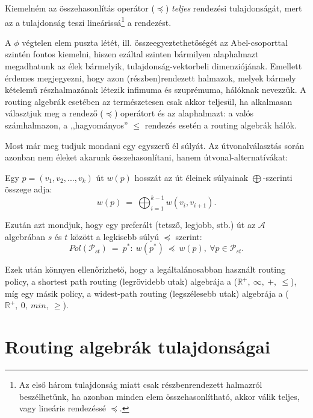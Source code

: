   \begin{note}
    Kiemelném az összehasonlítás operátor ($\preceq$) \emph{teljes} rendezési tulajdonságát, mert az a tulajdonság teszi lineárissá\footnote{Az első három tulajdonság miatt csak részbenrendezett halmazról beszélhetünk, ha azonban minden elem összehasonlítható, akkor válik teljes, vagy lineáris rendezéssé $\preceq$.} a rendezést.
  \end{note}

  \begin{note}
    A $\phi$ végtelen elem puszta létét, ill. összeegyeztethetőségét az Abel-csoporttal szintén fontos kiemelni, hiszen ezáltal szinten bármilyen alaphalmazt megadhatunk az élek bármelyik, tulajdonság-vektorbeli dimenziójának. Emellett érdemes megjegyezni, hogy azon (részben)rendezett halmazok, melyek bármely kételemű részhalmazának létezik infimuma és szuprémuma, hálóknak nevezzük. A routing algebrák esetében az természetesen csak akkor teljesül, ha alkalmasan választjuk meg a rendező ($\preceq$) operátort és az alaphalmazt: a valós számhalmazon, a ,,hagyományos'' $\leq$ rendezés esetén a routing algebrák hálók.
  \end{note}

  Most már meg tudjuk mondani egy egyszerű él súlyát. Az útvonalválasztás során azonban nem éleket akarunk összehasonlítani, hanem útvonal-alternatívákat:

  \begin{definition} 
    Egy $p=(v_{1}, v_{2}, ..., v_{k})$ út $w(p)$ hosszát az út éleinek súlyainak $\bigoplus$-szerinti összege adja: $$w(p)~=~\bigoplus_{i=1}^{k-1}w(v_{i}, v_{i+1}).$$
  \end{definition}

  Ezután azt mondjuk, hogy egy preferált (tetsző, legjobb, stb.) út az $\mathcal{A}$ algebrában $s$ és $t$ között a legkisebb súlyú $\preceq$ szerint: $$Pol(\mathcal{P}_{st})~=~p^{*}:~w(p^{*})~\preceq~w(p),~\forall p \in \mathcal{P}_{st}.$$

  Ezek után könnyen ellenőrizhető, hogy a legáltalánosabban használt routing policy, a shortest path routing (legrövidebb utak) algebrája a ($\mathbb{R}^{+},~\infty,~+,~\leq$), míg egy másik policy, a widest-path routing (legszélesebb utak) algebrája a ($\mathbb{R}^{+},~0,~min,~\geq$).

  \section{Routing algebrák tulajdonságai}\label{section_algebratulajdonsagok}

